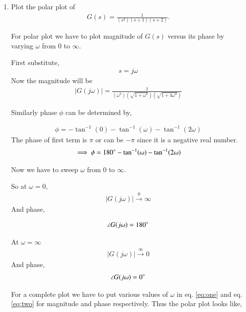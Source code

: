 \begin{enumerate}[label=\thesection.\arabic*.,ref=\thesection.\theenumi]
\item Plot the polar plot of 
\begin{align}
    G(s) = \frac{1}{(s^2)(s+1)(s+2)}. 
    \label{eq:t1}
\end{align}

\solution
For polar plot we have to plot magnitude of $G(s)$ versus its phase
by varying $\omega$ from 0 to $\infty$.

First substitute, 
\begin{align}
    s = j\omega
\end{align}
Now the magnitude will be
\begin{align}
    |G(j\omega)| = \frac{1}{(\omega^2)(\sqrt{1 + \omega^2})(\sqrt{1+4\omega^2})}
    \label{eq:two}
\end{align}


Similarly phase $\phi$ can be determined by,

\begin{align}
  \phi = - \tan^{-1}(0) - \tan^{-1}(\omega) - \tan^{-1}(2\omega)
\end{align}
The phase of first term is $\pi$ or can be $-\pi$ since it is a negative real number.
\begin{align}
    \implies \phi = 180\degree - \tan^{-1}(\omega) - \tan^{-1}(2\omega)
    \label{eq:one}
\end{align}

Now we have to sweep $\omega$ from 0 to $\infty$.

So at $\omega = 0$,
\begin{align}
    |G(j \omega)| \xrightarrow{0} \infty 
\end{align}
And phase,

\begin{align}
    \angle {G(j \omega)} = 180 \degree
\end{align}

At $\omega = \infty$
\begin{align}
    |G(j \omega)| \xrightarrow{\infty} 0
\end{align}
 And phase,
\begin{align}
    \angle {G(j \omega)} = 0 \degree
\end{align}

For a complete plot we have to put various values of $\omega$ in 
eq. \ref{eq:one} and eq. \ref{eq:two} for magnitude and phase respectively.
Thus the polar plot looks like, 



\end{enumerate}
